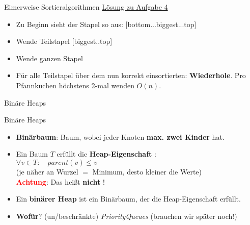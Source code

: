 \begin{frame}{Eimerweise Sortieralgorithmen}
	\underline{Lösung zu Aufgabe 4} \\
	\begin{itemize}
		\item Zu Beginn sieht der Stapel so aus: [bottom...biggest...top]
		\item Wende Teilstapel [biggest..top] 
		\item Wende ganzen Stapel 
		\item Für alle Teilstapel über dem nun korrekt einsortierten: \textbf{Wiederhole}.
		\implitem Pro Pfannkuchen höchstens 2-mal wenden \impl $O(n)$.
	\end{itemize}
\end{frame}



\begin{headframe}
	Binäre Heaps
\end{headframe}

\begin{frame}{Binäre Heaps}
	\textbf{} 
	\begin{itemize}
		\item \textbf{Binärbaum}: Baum, wobei jeder Knoten \textbf{max. zwei Kinder} hat.
		\pause
		\item Ein Baum $T$ erfüllt die \textbf{Heap-Eigenschaft} :\gdw \\ 
		$\forall v \in T : \quad parent(v) \leq v$ \\ 
		{\small (je näher an Wurzel $=$ Minimum, desto kleiner die Werte) } \\
		\textcolor{red}{\textbf{Achtung}}: Das heißt \textbf{nicht} !
		\pause
		\item Ein \textbf{binärer Heap} ist ein Binärbaum, der die Heap-Eigenschaft erfüllt.
		\pause
		\item \textbf{Wofür}? \impl (un/beschränkte) \textit{PriorityQueues}  {\small (brauchen wir später noch!)}
	\end{itemize}
\end{frame}

